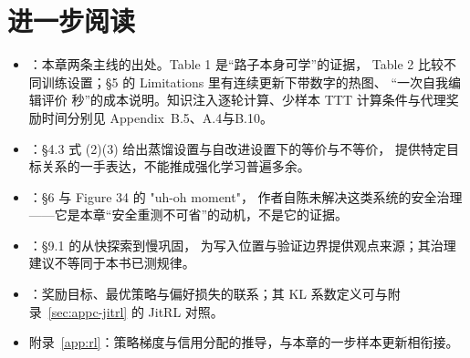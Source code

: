\section*{进一步阅读}
\begin{itemize}
  \item \cite{seal-2506}：本章两条主线的出处。Table 1 是“路子本身可学”的证据，
        Table 2 比较不同训练设置；§5 的 Limitations 里有连续更新下带数字的热图、
        “一次自我编辑评价  秒”的成本说明。知识注入逐轮计算、少样本 TTT 计算条件与代理奖励时间分别见 Appendix~B.5、A.4与B.10。
  \item \cite{self-challenging-2506}：§4.3 式 (2)(3) 给出蒸馏设置与自改进设置下的等价与不等价，
        提供特定目标关系的一手表达，不能推成强化学习普遍多余。
  \item \cite{absolute-zero-2505}：§6 与 Figure 34 的 "uh-oh moment"，
        作者自陈未解决这类系统的安全治理——它是本章“安全重测不可省”的动机，不是它的证据。
  \item \cite{self-improvements-survey-2607}：§9.1 的从快探索到慢巩固，
        为写入位置与验证边界提供观点来源；其治理建议不等同于本书已测规律。
  \item \cite{dpo-2305}：奖励目标、最优策略与偏好损失的联系；其 KL 系数定义可与附录~\ref{sec:appc-jitrl} 的 JitRL 对照。
  \item 附录~\ref{app:rl}：策略梯度与信用分配的推导，与本章的一步样本更新相衔接。
\end{itemize}
